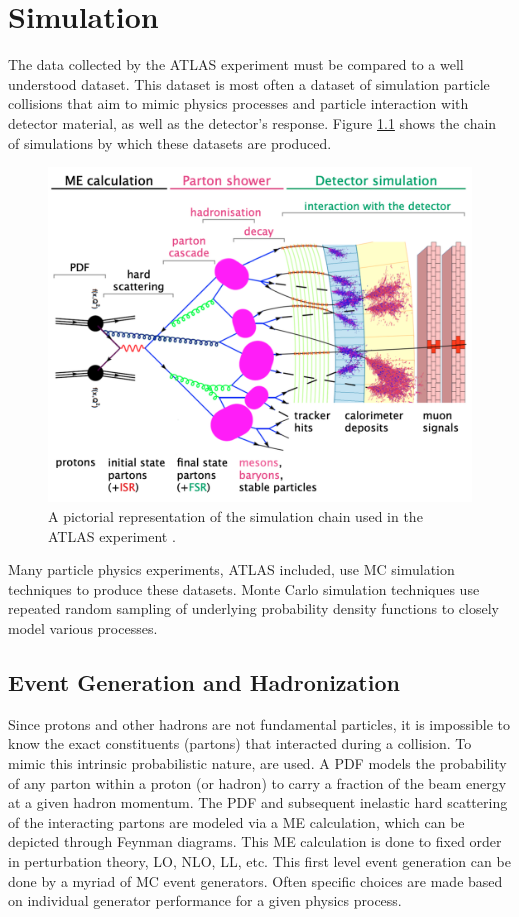 \chapter{Simulation}\label{chap:sim}
	The data collected by the \gls{ATLAS} experiment must be compared to a well understood dataset. This dataset is most often a dataset of simulation particle collisions that aim to mimic physics processes and particle interaction with detector material, as well as the detector's response. Figure \ref{fig:simulation} shows the chain of simulations by which these datasets are produced.
	\begin{figure}[!ht]
	\centering
	\includegraphics[width=.95\textwidth,keepaspectratio=true]{chapters/chapter4_simulation/images/Simulation_Chain.png}
	\caption{\label{fig:simulation} A pictorial representation of the simulation chain used in the \gls{ATLAS} experiment \cite{Wanotayaroj:2242196}.}
	\end{figure}
	
	Many particle physics experiments, \gls{ATLAS} included, use \gls{MC} simulation techniques to produce these datasets. Monte Carlo simulation techniques use repeated random sampling of underlying probability density functions to closely model various processes. 

	\section{Event Generation and Hadronization}\label{sec:event-gen}
		Since protons and other hadrons are not fundamental particles, it is impossible to know the exact constituents (partons) that interacted during a collision. To mimic this intrinsic probabilistic nature,  are used. A \gls{PDF} models the probability of any parton within a proton (or hadron) to carry a fraction of the beam energy at a given hadron momentum. The \gls{PDF} and subsequent inelastic hard scattering of the interacting partons are modeled via a \gls{ME} calculation, which can be depicted through Feynman diagrams. This \gls{ME} calculation is done to fixed order in perturbation theory, \gls{LO}, \gls{NLO}, \gls{LL}, etc. This first level event generation can be done by a myriad of \gls{MC} event generators. Often specific choices are made based on individual generator performance for a given physics process.

